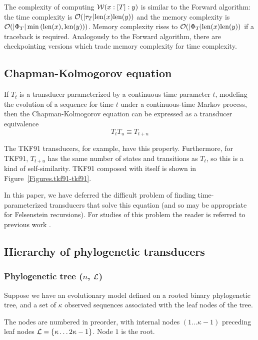 \documentclass{article}
\newcommand{\seclabel}[1]{\label{sec.#1}}
\newcommand{\figref}[1]{Figure~\ref{Figures.#1}}
\newcommand\wtrans[4]{#1(#2 : [#3] : #4)}
\newcommand\transequiv{\equiv}
\newcommand\compose{}
\newcommand\States{\Phi}
\newcommand\statesof[1]{\States_{#1}}
\newcommand\Transitions{\tau}
\newcommand\transitionsof[1]{\Transitions_{#1}}
\newcommand\weight{{\cal W}}
\newcommand\numberofstates[1]{|\statesof{#1}|}
\newcommand\numberoftransitions[1]{|\transitionsof{#1}|}
\newcommand\numberofleaves{\kappa}
\newcommand\numberofinternalnodes{\numberofleaves - 1}
\newcommand\numberofnodes{2\numberofleaves - 1}
\newcounter{LeafIndex}
\newcommand\leafnode[1]{\numberofleaves \ifthenelse{\equal{#1}{1}}{}{\setcounter{LeafIndex}{#1} \addtocounter{LeafIndex}{-1} +\arabic{LeafIndex}}}
\newcommand\leaves{{\cal L}}
\newcommand\seqlen[1]{\mbox{len}(#1)}
\newcommand\order[1]{{\cal O}(#1)}
\begin{document}
The complexity of computing $\wtrans{\weight}{x}{T}{y}$ is similar to the Forward algorithm:
the time complexity is $\order{\numberoftransitions{T} \seqlen{x} \seqlen{y}}$ and
the memory complexity is $\order{\numberofstates{T} \min\left(\seqlen{x},\seqlen{y}\right)}$.
Memory complexity rises to $\order{\numberofstates{T} \seqlen{x} \seqlen{y}}$ if a traceback is required.
Analogously to the Forward algorithm, there are checkpointing versions which trade memory complexity for time complexity.


\subsection{Chapman-Kolmogorov equation}
\seclabel{ChapmanKolmogorov}

If $T_t$ is a transducer parameterized by a continuous time parameter $t$,
modeling the evolution of a sequence for time $t$ under a continuous-time Markov process,
then the Chapman-Kolmogorov equation \cite{KarlinTaylor75} can be expressed as a transducer equivalence
\[
T_t \compose T_u \transequiv T_{t+u}
\]

The TKF91 transducers, for example, have this property.
Furthermore, for TKF91, $T_{t+u}$ has the same number of states and transitions as $T_t$,
so this is a kind of self-similarity.
TKF91 composed with itself is shown in \figref{tkf91-tkf91}. 

In this paper, we have deferred the difficult problem of finding time-parameterized transducers that solve this equation
(and so may be appropriate for Felsenstein recursions).
For studies of this problem the reader is referred to previous work \cite{ThorneEtal91,ThorneEtal92,KnudsenMiyamoto2003,MiklosLunterHolmes2004,Rivas05}.

\subsection{Hierarchy of phylogenetic transducers}
\seclabel{ModelStructure}
\subsubsection{Phylogenetic tree ($n$, $\leaves$)}
Suppose we have an evolutionary model defined on a rooted binary phylogenetic tree,
and a set of $\numberofleaves$ observed sequences associated with the leaf nodes of the tree.

The nodes are numbered in preorder, with internal nodes $(1 \ldots \numberofinternalnodes)$ preceding leaf nodes $\leaves = \{ \leafnode{1} \ldots \numberofnodes \}$. Node $1$ is the root.
\end{document}
